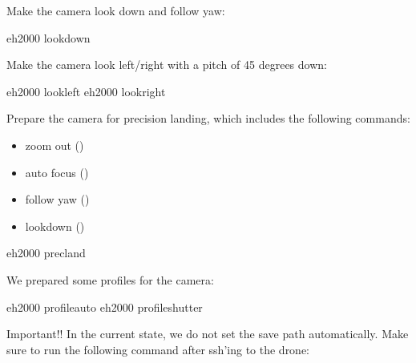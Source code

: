 \documentclass[letterpaper,10pt,english]{sphinxmanual}
\begin{document}
Make the camera look down and follow yaw:

\begin{sphinxVerbatim}[commandchars=\\\{\}]
eh2000  lookdown
\end{sphinxVerbatim}

Make the camera look left/right with a pitch of 45 degrees down:

\begin{sphinxVerbatim}[commandchars=\\\{\}]
eh2000  lookleft
eh2000  lookright
\end{sphinxVerbatim}

Prepare the camera for precision landing, which includes the following commands:
\begin{itemize}
\item {} 
zoom out ()

\item {} 
auto focus ()

\item {} 
follow yaw ()

\item {} 
lookdown ()

\end{itemize}

\begin{sphinxVerbatim}[commandchars=\\\{\}]
eh2000  precland
\end{sphinxVerbatim}

We prepared some profiles for the camera:

\begin{sphinxVerbatim}[commandchars=\\\{\}]
eh2000  profile\PYGZus{}auto
eh2000  profile\PYGZus{}shutter
\end{sphinxVerbatim}

Important!! In the current state, we do not set the save path automatically. Make sure to run the following command after ssh’ing to the drone:
\end{document}
